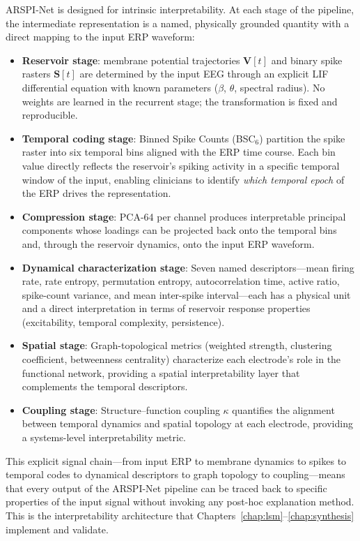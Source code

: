 ARSPI-Net is designed for intrinsic interpretability. At each stage of the pipeline, the intermediate representation is a named, physically grounded quantity with a direct mapping to the input ERP waveform:
\begin{itemize}
    \item \textbf{Reservoir stage}: membrane potential trajectories $\mathbf{V}[t]$ and binary spike rasters $\mathbf{S}[t]$ are determined by the input EEG through an explicit LIF differential equation with known parameters ($\beta$, $\theta$, spectral radius). No weights are learned in the recurrent stage; the transformation is fixed and reproducible.
    \item \textbf{Temporal coding stage}: Binned Spike Counts (BSC$_6$) partition the spike raster into six temporal bins aligned with the ERP time course. Each bin value directly reflects the reservoir's spiking activity in a specific temporal window of the input, enabling clinicians to identify \emph{which temporal epoch} of the ERP drives the representation.
    \item \textbf{Compression stage}: PCA-64 per channel produces interpretable principal components whose loadings can be projected back onto the temporal bins and, through the reservoir dynamics, onto the input ERP waveform.
    \item \textbf{Dynamical characterization stage}: Seven named descriptors---mean firing rate, rate entropy, permutation entropy, autocorrelation time, active ratio, spike-count variance, and mean inter-spike interval---each has a physical unit and a direct interpretation in terms of reservoir response properties (excitability, temporal complexity, persistence).
    \item \textbf{Spatial stage}: Graph-topological metrics (weighted strength, clustering coefficient, betweenness centrality) characterize each electrode's role in the functional network, providing a spatial interpretability layer that complements the temporal descriptors.
    \item \textbf{Coupling stage}: Structure--function coupling $\kappa$ quantifies the alignment between temporal dynamics and spatial topology at each electrode, providing a systems-level interpretability metric.
\end{itemize}

This explicit signal chain---from input ERP to membrane dynamics to spikes to temporal codes to dynamical descriptors to graph topology to coupling---means that every output of the ARSPI-Net pipeline can be traced back to specific properties of the input signal without invoking any post-hoc explanation method. This is the interpretability architecture that Chapters~\ref{chap:lsm}--\ref{chap:synthesis} implement and validate.

